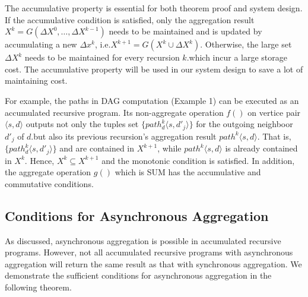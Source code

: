  The accumulative property is essential for both theorem proof and system design. If the accumulative condition is satisfied, only the aggregation result $X^k=G(\Delta X^{0},\ldots,\Delta X^{k-1})$ needs to be maintained and is updated by accumulating a new $\Delta x^{k}$, i.e.$X^{k+1}=G(X^k \cup \Delta X^k)$. Otherwise, the large set $\Delta X^{k}$ needs to be maintained for every recursion $k$.which incur a large storage cost. The accumulative property will be used in our system design to save a lot of maintaining cost.

For example, the paths in DAG computation (Example 1) can be executed as an accumulated recursive program. Its non-aggregate operation $f()$ on vertice pair$\langle s,d\rangle$ outputs not only the tuples set $\{path^k_d\langle s,d'_j\rangle\}$ for the outgoing neighboor $d'_j$ of $d$.but also its previous recursion's aggregation result $path^k\langle s,d\rangle$. That is, $\{path^k_d\langle s,d'_j\rangle\}$ and are contained in $X^{k+1}$, while  $path^k\langle s,d\rangle$ is already contained in $X^{k}$. Hence, $X^{k}\subseteq X^{k+1}$ and the monotonic condition is satisfied. In addition, the aggregate operation $g()$ which is SUM has the accumulative and commutative conditions.



\subsection{Conditions for Asynchronous Aggregation}
\label{sec:async:condition}

As discussed, asynchronous aggregation is possible in accumulated recursive programs. However, not all accumulated recursive programs with asynchronous aggregation will return the same result as that with synchronous aggregation. We demonstrate the sufficient conditions for asynchronous aggregation in the following theorem.

